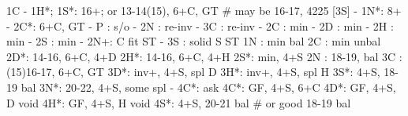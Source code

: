 1C - 1H*;
1S*: 16+; or 13-14(15), 6+C, GT  # may be 16-17, 4225 [3S]
   - 1N*: 8+
        - 2C*: 6+C, GT
             - P  : s/o
             - 2N : re-inv
             - 3C : re-inv
   - 2C : min
   - 2D : min
   - 2H : min
   - 2S : min 
   - 2N+: C fit ST
   - 3S : solid S ST
1N : min bal
2C : min unbal
2D*: 14-16, 6+C, 4+D
2H*: 14-16, 6+C, 4+H 
2S*: min, 4+S
2N : 18-19, bal
3C : (15)16-17, 6+C, GT
3D*: inv+, 4+S, spl D
3H*: inv+, 4+S, spl H
3S*: 4+S, 18-19 bal
3N*: 20-22, 4+S, some spl
   - 4C*: ask
4C*: GF, 4+S, 6+C
4D*: GF, 4+S, D void 
4H*: GF, 4+S, H void 
4S*: 4+S, 20-21 bal  # or good 18-19 bal